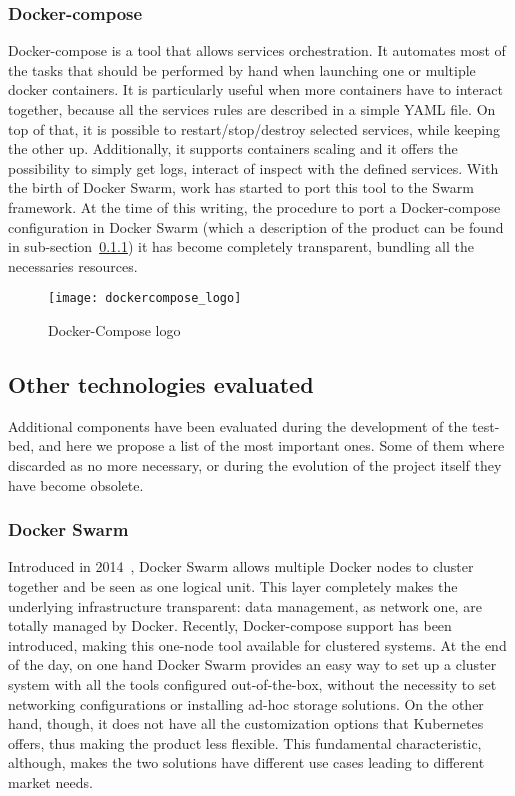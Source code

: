 \subsubsection{Docker-compose} 
Docker-compose is a tool that allows services orchestration. It automates most
of the tasks that should be performed by hand when launching one or multiple
docker containers. It is particularly useful when more containers have to
interact together, because all the services rules are described in a simple YAML
file. On top of that, it is possible to restart/stop/destroy selected services,
while keeping the other up. Additionally, it supports containers scaling and it
offers the possibility to simply get logs, interact of inspect with the defined
services. With the birth of Docker Swarm, work has started to port this tool to
the Swarm framework. At the time of this writing, the procedure to port a
Docker-compose configuration in Docker Swarm (which a description of the product
can be found in sub-section~\ref{chap:prjan:sec:tech:sub:other:sub:swarm}) it
has become completely transparent, bundling all the necessaries resources.

\begin{figure}[h]
  \centering
  \texttt{[image: dockercompose\_logo]}
  \caption[Docker-Compose logo]{Docker-Compose logo}
\end{figure}

\subsection{Other technologies evaluated}

Additional components have been evaluated during the development of the 
test-bed, and here we propose a list of the most important ones. Some of them 
where discarded as no more necessary, or during the evolution of the project 
itself they have become obsolete.

\subsubsection{Docker Swarm}
\label{chap:prjan:sec:tech:sub:other:sub:swarm}
Introduced in 2014~\cite{swarmGit}, Docker Swarm allows multiple Docker nodes to
cluster together and be seen as one logical unit. This layer completely makes
the underlying infrastructure transparent: data management, as network one, are
totally managed by Docker. Recently, Docker-compose support has been introduced,
making this one-node tool available for clustered systems. At the end of the
day, on one hand Docker Swarm provides an easy way to set up a cluster system
with all the tools configured out-of-the-box, without the necessity to set
networking configurations or installing ad-hoc storage solutions. On the other
hand, though, it does not have all the customization options that Kubernetes
offers, thus making the product less flexible. This fundamental characteristic,
although, makes the two solutions have different use cases leading to different
market needs.

